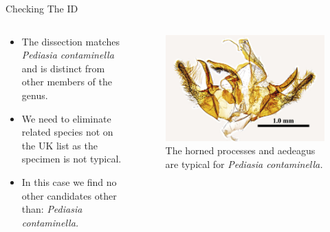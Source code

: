 \documentclass[
  ignorenonframetext,
]{beamer}
\providecommand{\tightlist}{%
  \setlength{\itemsep}{0pt}\setlength{\parskip}{0pt}}
\begin{document}
\begin{frame}{Checking The ID}
\protect\hypertarget{checking-the-id}{}
\begin{columns}[T]
\begin{column}{0.5\textwidth}
\begin{itemize}
\tightlist
\item
  The dissection matches \emph{Pediasia contaminella} and is distinct
  from other members of the genus.
\item
  We need to eliminate related species not on the UK list as the
  specimen is not typical.
\item
  In this case we find no other candidates other than: \emph{Pediasia
  contaminella.}
\end{itemize}
\end{column}

\begin{column}{0.5\textwidth}
\begin{figure}
\centering
\includegraphics{./images/PJP20220218-001-developed-dissection.jpg}
\caption{The horned processes and aedeagus are typical for
\emph{Pediasia contaminella.}}
\end{figure}
\end{column}
\end{columns}
\end{frame}
\end{document}
